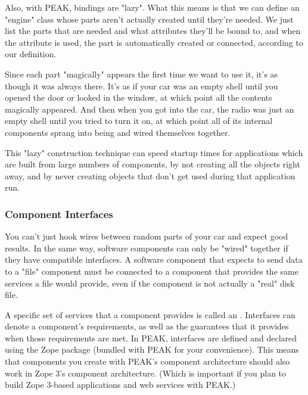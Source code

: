 Also, with PEAK, bindings are "lazy".  What this means is that we can define
an "engine" class whose parts aren't actually created until they're needed.
We just list the parts that are needed and what attributes they'll be bound
to, and when the attribute is used, the part is automatically created or
connected, according to our definition.

Since each part "magically" appears the first time we want to use it, it's
as though it was always there.  It's as if your car was an empty shell until
you opened the door or looked in the window, at which point all the contents
magically appeared.  And then when you got into the car, the radio was just
an empty shell until you tried to turn it on, at which point all of its
internal components sprang into being and wired themselves together.

This "lazy" construction technique can speed startup times for applications
which are built from large numbers of components, by not creating all the
objects right away, and by never creating objects that don't get used during
that application run.










\subsubsection{Component Interfaces}

You can't just hook wires between random parts of your car and expect good
results.  In the same way, software components can only be "wired" together
if they have compatible interfaces.  A software component that expects to
send data to a "file" component must be connected to a component that
provides the same services a file would provide, even if the component is not
actually a "real" disk file.

A specific set of services that a component provides is called an
.  Interfaces can denote a component's requirements, as well
as the guarantees that it provides when those requirements are met.  In PEAK,
interfaces are defined and declared using the Zope  package
(bundled with PEAK for your convenience).   This means that components you
create with PEAK's component architecture should also work in Zope 3's
component architecture.  (Which is important if you plan to build Zope
3-based applications and web services with PEAK.)

